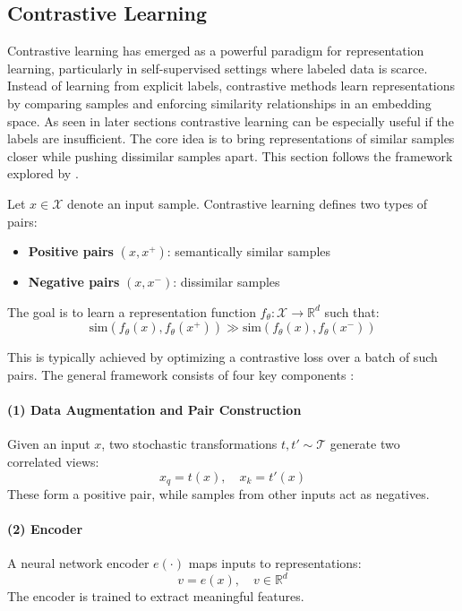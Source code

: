 \subsection{Contrastive Learning} \label{sec:contrastive_learning}

Contrastive learning has emerged as a powerful paradigm for representation learning, particularly in self-supervised settings where labeled data is scarce. Instead of learning from explicit labels, contrastive methods learn representations by comparing samples and enforcing similarity relationships in an embedding space. As seen in later sections contrastive learning can be especially useful if the labels are insufficient. The core idea is to bring representations of similar samples closer while pushing dissimilar samples apart. This section follows the framework explored by \citet{LeKhac2020}.

Let $x \in \mathcal{X}$ denote an input sample. Contrastive learning defines two types of pairs:
\begin{itemize}
    \item \textbf{Positive pairs} $(x, x^+)$: semantically similar samples
    \item \textbf{Negative pairs} $(x, x^-)$: dissimilar samples
\end{itemize}

The goal is to learn a representation function $f_\theta: \mathcal{X} \rightarrow \mathbb{R}^d$ such that:
\begin{equation}
\text{sim}(f_\theta(x), f_\theta(x^+)) \gg \text{sim}(f_\theta(x), f_\theta(x^-))
\end{equation}

This is typically achieved by optimizing a contrastive loss over a batch of such pairs. The general framework consists of four key components \citep{LeKhac2020}:

\paragraph{(1) Data Augmentation and Pair Construction}
Given an input $x$, two stochastic transformations $t, t' \sim \mathcal{T}$ generate two correlated views:
\begin{equation}
x_q = t(x), \quad x_k = t'(x)
\end{equation}
These form a positive pair, while samples from other inputs act as negatives.

\paragraph{(2) Encoder}
A neural network encoder $e(\cdot)$ maps inputs to representations:
\begin{equation}
v = e(x), \quad v \in \mathbb{R}^d
\end{equation}
The encoder is trained to extract meaningful features.

